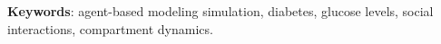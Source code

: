 \documentclass{wscpaperproc}
\theoremstyle{wsc}
\begin{document}
\noindent \textbf{Keywords}: agent-based modeling simulation, diabetes, glucose
levels, social interactions, compartment dynamics.
















\end{document}
